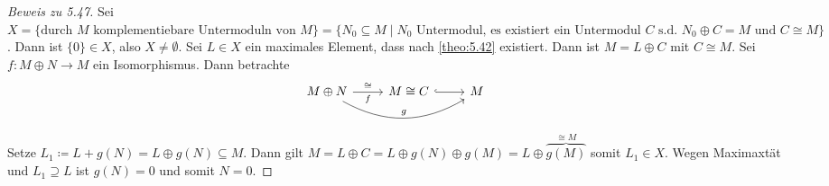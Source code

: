 \documentclass[../main.tex]{subfiles}
\begin{document}
\begin{proof}[Beweis zu 5.47]
    Sei $X=\{\text{durch $M$ komplementiebare Untermoduln von $M$}\} = \{N_0\subseteq M\mid\text{$N_0$ Untermodul, es existiert ein Untermodul $C$ s.d. $N_0\oplus C = M$ und $C\cong M$} \}$.
     Dann ist $\{0\}\in X$, also $X\neq \emptyset$. Sei $L\in X$ ein maximales Element, dass nach \ref{theo:5.42} existiert.
     Dann ist $M=L\oplus C$ mit $C\cong M$.
     Sei $f:M\oplus N\rightarrow M$ ein Isomorphismus.
     Dann betrachte 
     $$%
    \begin{tikzcd}
    M\oplus N \arrow[r, "\cong", "f"'] \arrow[rr, "g", bend right] & M\cong C \arrow[r, hook] & M
    \end{tikzcd}$$
    Setze $L_1\coloneqq L + g(N) = L\oplus g(N)\subseteq M$.
    Dann gilt $M=L\oplus C = L\oplus g(N)\oplus g(M) = L\oplus \overbrace{g(M)}^{\cong M}$ somit $L_1\in X$.
    Wegen Maximaxtät und $L_1\supseteq L$ ist $g(N) = 0$ und somit $N=0$.
\end{proof}
\end{document}
